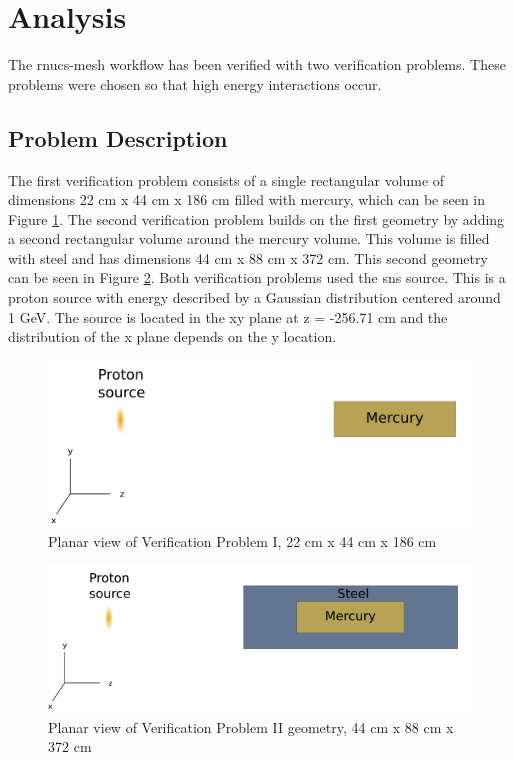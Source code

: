 \section{Analysis}\label{sc:analysis}
The rnucs-mesh workflow has been verified with two verification problems.
These problems were chosen so that high energy interactions occur.

\subsection{Problem Description}
The first verification problem consists of a single rectangular volume of
dimensions 22 cm x 44 cm x 186 cm filled with mercury, which can be seen
in Figure \ref{fig:VPI}. The second verification problem builds on the first
geometry by adding a second rectangular volume around the mercury volume.
This volume is filled with steel and has dimensions 44 cm x 88 cm x 372 cm.
This second geometry can be seen in Figure \ref{fig:VPII}.
Both verification problems used the \gls{sns} source. This is a proton source
with energy described by a Gaussian distribution centered around 1 GeV.
The source is located in the xy
plane at z = -256.71 cm and the distribution of the x plane depends on the
y location.
%
\begin{figure}[h!]
	\centering
	\includegraphics[scale=0.7]{../figs/mercury.png}
	\caption[VPI]{Planar view of Verification Problem I, 22 cm  x 44 cm x 186 cm}
	\label{fig:VPI}
\end{figure}
%
\begin{figure}[h!]
	\centering
	\includegraphics[scale=0.71]{../figs/mer_steel.png}
	\caption[VPI]{Planar view of Verification Problem II geometry, 44 cm x 88 cm x 372 cm}
	\label{fig:VPII}
\end{figure}
%
